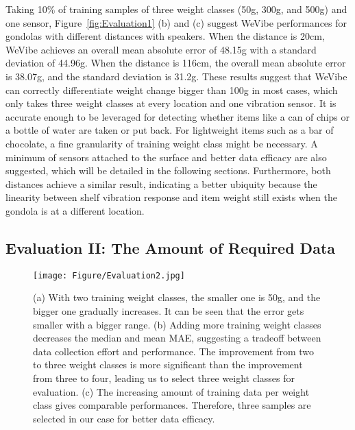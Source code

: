 Taking 10\% of training samples of three weight classes (50g, 300g, and 500g) and one sensor, Figure~\ref{fig:Evaluation1} (b) and (c) suggest WeVibe performances for gondolas with different distances with speakers. When the distance is 20cm, WeVibe achieves an overall mean absolute error of 48.15g with a standard deviation of 44.96g. When the distance is 116cm, the overall mean absolute error is 38.07g, and the standard deviation is 31.2g. These results suggest that WeVibe can correctly differentiate weight change bigger than 100g in most cases, which only takes three weight classes at every location and one vibration sensor. It is accurate enough to be leveraged for detecting whether items like a can of chips or a bottle of water are taken or put back. For lightweight items such as a bar of chocolate, a fine granularity of training weight class might be necessary. A minimum of sensors attached to the surface and better data efficacy are also suggested, which will be detailed in the following sections. Furthermore, both distances achieve a similar result, indicating a better ubiquity because the linearity between shelf vibration response and item weight still exists when the gondola is at a different location. 

\subsection{Evaluation II: The Amount of Required Data}
\label{eval:data}

\begin{figure}[tbh]
    \centering
    \texttt{[image: Figure/Evaluation2.jpg]}
    \caption{(a) With two training weight classes, the smaller one is 50g, and the bigger one gradually increases. It can be seen that the error gets smaller with a bigger range. (b) Adding more training weight classes decreases the median and mean MAE, suggesting a tradeoff between data collection effort and performance. The improvement from two to three weight classes is more significant than the improvement from three to four, leading us to select three weight classes for evaluation.  (c) The increasing amount of training data per weight class gives comparable performances. Therefore, three samples are selected in our case for better data efficacy.}
    \label{fig:Evaluation2}
\end{figure}

